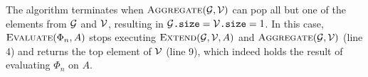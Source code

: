  The algorithm terminates when $\textsc{Aggregate}(\mathcal{G},\mathcal{V})$ can pop all but one of the elements from $\mathcal{G}$ and $\mathcal{V}$, resulting in $\mathcal{G}\texttt{.size} = \mathcal{V}\texttt{.size}=1$. In this case,  $\textsc{Evaluate}(\Phi_n,A)$ stops executing $\textsc{Extend}(\mathcal{G},\mathcal{V},A)$ and $\textsc{Aggregate}(\mathcal{G},\mathcal{V})$ (line 4) and returns the top element of $\mathcal{V}$ (line 9),  which indeed holds the result of evaluating $\Phi_n$ on $A$.
 
%
%
%
%
%
%
%
